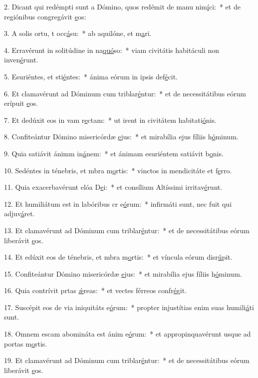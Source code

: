 2. Dicant qui redémpti sunt a Dómino, quos redémit de manu nim\uline{í}ci:~* et de regiónibus congregávit \uline{e}os:\par 
3. A solis ortu, t occ\uline{á}su:~* ab aquilóne, et m\uline{a}ri.\par 
4. Erravérunt in solitúdine in na\uline{quó}so:~* viam civitátis habitáculi non inven\uline{é}runt.\par 
5. Esuriéntes, et sti\uline{é}ntes:~* ánima eórum in ipsis def\uline{é}cit.\par 
6. Et clamavérunt ad Dóminum cum triblar\uline{é}ntur:~* et de necessitátibus eórum erípuit \uline{e}os.\par 
7. Et dedúxit eos in vam r\uline{e}ctam:~* ut irent in civitátem habitati\uline{ó}nis.\par 
8. Confiteántur Dómino misericórdæ \uline{e}jus:~* et mirabília ejus fíliis h\uline{ó}minum.\par 
9. Quia satiávit ánimm in\uline{á}nem:~* et ánimam esuriéntem satiávit b\uline{o}nis.\par 
10. Sedéntes in ténebris, et mbra m\uline{o}rtis:~* vinctos in mendicitáte et f\uline{e}rro.\par 
11. Quia exacerbavérunt elóa D\uline{e}i:~* et consílium Altíssimi irritav\uline{é}runt.\par 
12. Et humiliátum est in labóribus cr e\uline{ó}rum:~* infirmáti sunt, nec fuit qui adjuv\uline{á}ret.\par 
13. Et clamavérunt ad Dóminum cum triblar\uline{é}ntur:~* et de necessitátibus eórum liberávit \uline{e}os.\par 
14. Et edúxit eos de ténebris, et mbra m\uline{o}rtis:~* et víncula eórum disr\uline{ú}pit.\par 
15. Confiteántur Dómino misericórdæ \uline{e}jus:~* et mirabília ejus fíliis h\uline{ó}minum.\par 
16. Quia contrívit prtas \uline{ǽ}reas:~* et vectes férreos confr\uline{é}git.\par 
17. Suscépit eos de via iniquitáts e\uline{ó}rum:~* propter injustítias enim suas humili\uline{á}ti sunt.\par 
18. Omnem escam abomináta est ánim e\uline{ó}rum:~* et appropinquavérunt usque ad portas m\uline{o}rtis.\par 
19. Et clamavérunt ad Dóminum cum triblar\uline{é}ntur:~* et de necessitátibus eórum liberávit \uline{e}os.\par 
